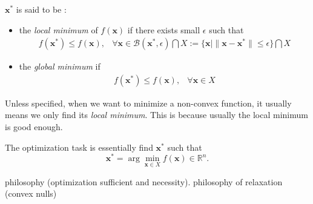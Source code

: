 \begin{definition}[Optimality]
$\bm x^*$ is said to be :
\begin{itemize}
\item
the \emph{local minimum} of $f(\bm x)$ if there exists small $\epsilon$ such that
\[
\begin{array}{ll}
f(\bm x^*)\le f(\bm x),
&
\forall \bm x\in\mathcal{B}(\bm x^*,\epsilon)\bigcap X:=\{\bm x\mid \|\bm x-\bm x^*\|\le\epsilon\}\bigcap X
\end{array}
\]
\item
the \emph{global minimum} if
\[
\begin{array}{ll}
f(\bm x^*)\le f(\bm x),
&
\forall \bm x\in X
\end{array}
\]
\end{itemize}
\end{definition}
\begin{remark}
Unless specified, when we want to minimize a non-convex function, it usually means we only find its \emph{local minimum}. This is because usually the local minimum is good enough.
\end{remark}

The optimization task is essentially find $\bm x^*$ such that
\[
\bm x^*=\arg\min_{\bm x\in X}f(\bm x)\in\mathbb{R}^n.
\]

philosophy (optimization sufficient and necessity). 
philosophy of relaxation (convex nulls)

